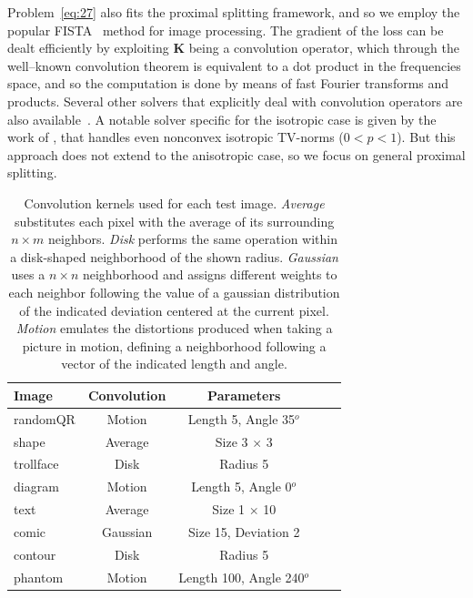 \documentclass[twoside,11pt]{article}
\newcommand{\mk}{\bm{K}}
\def\abovestrut#1{\rule[0in]{0in}{#1}\ignorespaces}
\def\belowstrut#1{\rule[-#1]{0in}{#1}\ignorespaces}
\def\abovespace{\abovestrut{0.20in}}
\def\belowspace{\belowstrut{0.10in}}
\numberwithin{equation}{section}
\numberwithin{theorem}{section}
\begin{document}
Problem~\eqref{eq:27} also fits the proximal splitting framework, and so we employ the popular FISTA~\citep{fista} method for image processing. The gradient of the loss can be dealt efficiently by exploiting $\mk$ being a convolution operator, which through the well--known convolution theorem is equivalent to a dot product in the frequencies space, and so the computation is done by means of fast Fourier transforms and products. Several other solvers that explicitly deal with convolution operators are also available~\citep{SALSA,TwIST}. A notable solver specific for the isotropic case is given by the work of \citet{Krishnan09}, that handles even nonconvex isotropic TV-norms ($0 < p < 1$). But this approach does not extend to the anisotropic case, so we focus on general proximal splitting.

\begin{table}[htbp]
\begin{center}
\begin{tabular}{lcccc}
\hline
\abovespace\belowspace
      Image & Convolution & Parameters \\
\hline
\abovespace
randomQR & Motion & Length 5, Angle 35$^o$ \\
shape & Average & Size 3 $\times$ 3 \\
trollface & Disk & Radius 5 \\
diagram & Motion & Length 5, Angle 0$^o$ \\
text & Average & Size 1 $\times$ 10 \\
comic & Gaussian & Size 15, Deviation 2 \\
contour & Disk & Radius 5 \\
\belowspace
phantom & Motion & Length 100, Angle 240$^o$
\\ \hline
\end{tabular}
\end{center}
\caption{\small Convolution kernels used for each test image. {\it Average} substitutes each pixel with the average of its surrounding $n \times m$ neighbors. {\it Disk} performs the same operation within a disk-shaped neighborhood of the shown radius. {\it Gaussian} uses a $n \times n$ neighborhood and assigns different weights to each neighbor following the value of a gaussian distribution of the indicated deviation centered at the current pixel. {\it Motion} emulates the distortions produced when taking a picture in motion, defining a neighborhood following a vector of the indicated length and angle.
\label{tab:convolutions}
}
\end{table}
\end{document}
